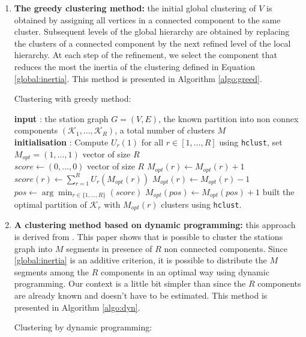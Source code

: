\begin{enumerate}
    \item \textbf{The greedy clustering method:} the initial global clustering of $V$ is obtained by assigning all vertices in a connected component to the same cluster. Subsequent levels of the global hierarchy are obtained by replacing the clusters of a connected component by the next refined level of the local hierarchy. At each step of the refinement, we select the component that reduces the most the inertia of the clustering defined in Equation \ref{global:inertia}. This method is presented in Algorithm \ref{algo:greed}.
    \begin{algorithm}[htbp]
\caption{Clustering with greedy method:}\label{algo:greed}
\begin{algorithmic}

\State \textbf{input} : the station graph $G=(V,E)$, the known partition into non connex components $(\mathcal{K}_1,\dots,\mathcal{K}_R)$, a total number of clusters $M$ \\
  
\State \textbf{initialisation} : Compute $U_r(1)$ for all $r \in [1,\dots,R]$ using \texttt{hclust}, set $M_{opt} = (1,\dots,1)$ vector of size $R$  \\

  \State $\textit{score}\gets(0,\dots,0)$ vector of size $R$
  \State $M_{opt}(r) \gets M_{opt}(r) + 1$
  \State $\textit{score}(r) \gets \sum_{r=1}^R U_r(M_{opt}(r))$
  \State $M_{opt}(r) \gets M_{opt}(r) - 1$
  \EndFor
  \State $\textit{pos} \gets \arg\min_{r\in\{1,\dots,R\}}(\textit{score})$
  \State $M_{opt}(pos) \gets M_{opt}(pos)+1$
\EndFor
{}
\State built the optimal partition of $\mathcal{K}_r$ with $M_{opt}(r)$ clusters using \texttt{hclust}.
\EndFor

\end{algorithmic}
\end{algorithm}
    \item \textbf{A clustering method based on dynamic programming:} this approach is derived from \cite{hebrail2010exploratory}. This paper shows that is possible to cluster the stations graph into $M$ segments in presence of $R$ non connected components. Since \eqref{global:inertia} is an additive criterion, it is possible to distribute the $M$ segments among the $R$ components in an optimal way using dynamic programming. Our context is a little bit simpler than \cite{hebrail2010exploratory} since the $R$ components are already known and doesn't have to be estimated. This method is presented in Algorithm \ref{algo:dyn}.  
    \begin{algorithm}[htbp]
\caption{Clustering by dynamic programming:}\label{algo:dyn}
\begin{algorithmic}


\end{algorithmic}
\end{algorithm}
\end{enumerate}
